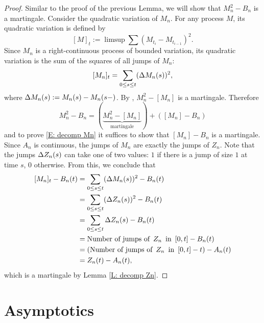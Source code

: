 \begin{proof} \label{P: decomp Mn}
	Similar to the proof of the previous Lemma, we will show that $M_n^2 - B_n$ is a martingale.
	Consider the quadratic variation of $M_n$.
	For any process $M$, its quadratic variation is defined by
	\begin{equation} \label{D: quadratic variation}
	[M]_t := \limsup \sum (M_{t_i} - M_{t_{i-1}})^2.
	\end{equation}
	Since $M_n$ is a right-continuous process of bounded variation, 
	its quadratic variation is the sum of the squares of all jumps of $M_n$:
	\begin{equation} \label{E: quadratic variation Mn}
	[M_n]_{t} = \sum_{0 \leq s \leq t} (\Delta M_n(s))^2,
	\end{equation}
	where $\Delta M_n(s) := M_n(s) - M_n(s-)$. 
	By \cite{N.Ethier1986}, $M_n^2 - [M_n]$ is a martingale.
	Therefore
	\begin{equation}
	M_n^2 - B_n = (\underbrace{M_n^2 - [M_n]}_{\text{martingale}}) + ([M_n] - B_n)
	\end{equation}
	and to prove \eqref{E: decomp Mn} it suffices to show that $[M_n] - B_n$ is a martingale.
	Since $A_n$ is continuous, the jumps of $M_n$ are exactly the jumps of $Z_n$.
	Note that the jumps $\Delta Z_n(s)$ can take one of two values: 
	$1$ if there is a jump of size $1$ at time $s$, 0 otherwise.
	From this, we conclude that
	\begin{align*}
	[M_n]_{t} - B_n(t)
	&= \sum_{0 \leq s \leq t} (\Delta M_n(s))^2 - B_n(t) \\
	&= \sum_{0 \leq s \leq t} (\Delta Z_n(s))^2 - B_n(t) \\
	&= \sum_{0 \leq s \leq t} \Delta Z_n(s) - B_n(t) \\
	&= \text{Number of jumps of} \enspace Z_n \enspace \text{in} \enspace [0,t] - B_n(t) \\
	&= (\text{Number of jumps of} \enspace Z_n \enspace \text{in} \enspace [0,t] - t) - A_n(t) \\
	&= Z_n(t) - A_n(t),
	\end{align*}
	which is a martingale by Lemma \ref{L: decomp Zn}.
\end{proof}




\section{Asymptotics}

